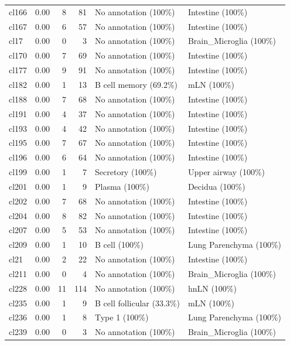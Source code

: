\begin{table}[ht!]
\begin{tabular}{lrrrll}
  cl166 & 0.00 &   8 &  81 & No annotation (100\%) & Intestine (100\%) \\ 
  cl167 & 0.00 &   6 &  57 & No annotation (100\%) & Intestine (100\%) \\ 
  cl17 & 0.00 &   0 &   3 & No annotation (100\%) & Brain\_Microglia (100\%) \\ 
  cl170 & 0.00 &   7 &  69 & No annotation (100\%) & Intestine (100\%) \\ 
  cl177 & 0.00 &   9 &  91 & No annotation (100\%) & Intestine (100\%) \\ 
  cl182 & 0.00 &   1 &  13 & B cell memory (69.2\%) & mLN (100\%) \\ 
  cl188 & 0.00 &   7 &  68 & No annotation (100\%) & Intestine (100\%) \\ 
  cl191 & 0.00 &   4 &  37 & No annotation (100\%) & Intestine (100\%) \\ 
  cl193 & 0.00 &   4 &  42 & No annotation (100\%) & Intestine (100\%) \\ 
  cl195 & 0.00 &   7 &  67 & No annotation (100\%) & Intestine (100\%) \\ 
  cl196 & 0.00 &   6 &  64 & No annotation (100\%) & Intestine (100\%) \\ 
  cl199 & 0.00 &   1 &   7 & Secretory (100\%) & Upper airway (100\%) \\ 
  cl201 & 0.00 &   1 &   9 & Plasma (100\%) & Decidua (100\%) \\ 
  cl202 & 0.00 &   7 &  68 & No annotation (100\%) & Intestine (100\%) \\ 
  cl204 & 0.00 &   8 &  82 & No annotation (100\%) & Intestine (100\%) \\ 
  cl207 & 0.00 &   5 &  53 & No annotation (100\%) & Intestine (100\%) \\ 
  cl209 & 0.00 &   1 &  10 & B cell (100\%) & Lung Parenchyma (100\%) \\ 
  cl21 & 0.00 &   2 &  22 & No annotation (100\%) & Intestine (100\%) \\ 
  cl211 & 0.00 &   0 &   4 & No annotation (100\%) & Brain\_Microglia (100\%) \\ 
  cl228 & 0.00 &  11 & 114 & No annotation (100\%) & hnLN (100\%) \\ 
  cl235 & 0.00 &   1 &   9 & B cell follicular (33.3\%) & mLN (100\%) \\ 
  cl236 & 0.00 &   1 &   8 & Type 1 (100\%) & Lung Parenchyma (100\%) \\ 
  cl239 & 0.00 &   0 &   3 & No annotation (100\%) & Brain\_Microglia (100\%) \\ 

\end{tabular}
\end{table}

